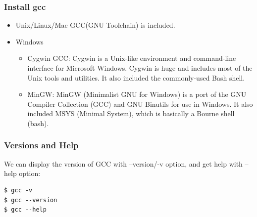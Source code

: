 \documentclass{beamer}
\begin{document}
\begin{frame}
\frametitle{Install gcc}
\begin{itemize}
\item Unix/Linux/Mac GCC(GNU Toolchain) is included.
\item Windows
\begin{itemize}
\item Cygwin GCC: Cygwin is a Unix-like environment and command-line interface for Microsoft Windows. Cygwin is huge and includes most of the Unix tools and utilities. It also included the commonly-used Bash shell.
\item MinGW: MinGW (Minimalist GNU for Windows) is a port of the GNU Compiler Collection (GCC) and GNU Binutils for use in Windows. It also included MSYS (Minimal System), which is basically a Bourne shell (bash).
\end{itemize}
\end{itemize}
\end{frame}

\begin{frame}[fragile]
\frametitle{Versions and Help}
We can display the version of GCC with --version/-v option, and get help with --help option:
\begin{example}
\begin{verbatim}
$ gcc -v
$ gcc --version
$ gcc --help
\end{verbatim}
\end{example}
\end{frame}
\end{document}
